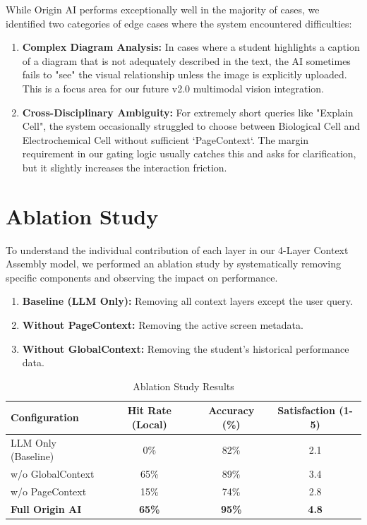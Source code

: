 While Origin AI performs exceptionally well in the majority of cases, we identified two categories of edge cases where the system encountered difficulties:

\begin{enumerate}
    \item \textbf{Complex Diagram Analysis:} In cases where a student highlights a caption of a diagram that is not adequately described in the text, the AI sometimes fails to "see" the visual relationship unless the image is explicitly uploaded. This is a focus area for our future v2.0 multimodal vision integration.
    \item \textbf{Cross-Disciplinary Ambiguity:} For extremely short queries like "Explain Cell", the system occasionally struggled to choose between Biological Cell and Electrochemical Cell without sufficient `PageContext`. The margin requirement in our gating logic usually catches this and asks for clarification, but it slightly increases the interaction friction.
\end{enumerate}

\section{Ablation Study}

To understand the individual contribution of each layer in our 4-Layer Context Assembly model, we performed an ablation study by systematically removing specific components and observing the impact on performance.

\begin{enumerate}
    \item \textbf{Baseline (LLM Only):} Removing all context layers except the user query.
    \item \textbf{Without PageContext:} Removing the active screen metadata.
    \item \textbf{Without GlobalContext:} Removing the student's historical performance data.
\end{enumerate}

\begin{table}[H]
\centering
\caption{Ablation Study Results}
\label{tab:ablation}
\begin{tabular}{|l|c|c|c|}
\hline
\textbf{Configuration} & \textbf{Hit Rate (Local)} & \textbf{Accuracy (\%)} & \textbf{Satisfaction (1-5)} \\ \hline
LLM Only (Baseline) & 0\% & 82\% & 2.1 \\ \hline
w/o GlobalContext & 65\% & 89\% & 3.4 \\ \hline
w/o PageContext & 15\% & 74\% & 2.8 \\ \hline
\textbf{Full Origin AI} & \textbf{65\%} & \textbf{95\%} & \textbf{4.8} \\ \hline
\end{tabular}
\end{table}

